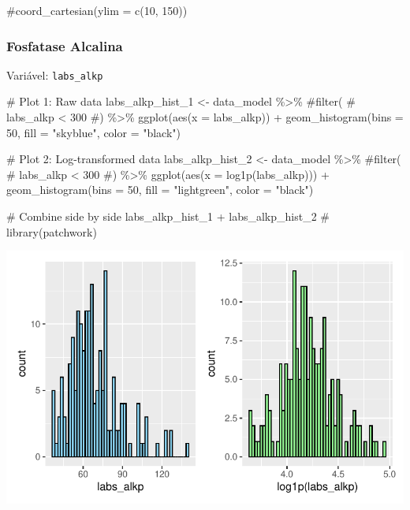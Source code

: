 \documentclass[
  12pt,
]{article}
\newenvironment{Shaded}{\begin{snugshade}}{\end{snugshade}}
\newcommand{\AttributeTok}[1]{\textcolor[rgb]{0.40,0.45,0.13}{#1}}
\newcommand{\CommentTok}[1]{\textcolor[rgb]{0.37,0.37,0.37}{#1}}
\newcommand{\DecValTok}[1]{\textcolor[rgb]{0.68,0.00,0.00}{#1}}
\newcommand{\FunctionTok}[1]{\textcolor[rgb]{0.28,0.35,0.67}{#1}}
\newcommand{\NormalTok}[1]{\textcolor[rgb]{0.00,0.23,0.31}{#1}}
\newcommand{\OtherTok}[1]{\textcolor[rgb]{0.00,0.23,0.31}{#1}}
\newcommand{\SpecialCharTok}[1]{\textcolor[rgb]{0.37,0.37,0.37}{#1}}
\newcommand{\StringTok}[1]{\textcolor[rgb]{0.13,0.47,0.30}{#1}}
\begin{document}
\begin{Shaded}
\begin{Highlighting}[]
    \CommentTok{\#coord\_cartesian(ylim = c(10, 150))}
\end{Highlighting}
\end{Shaded}

\subsubsection{Fosfatase Alcalina}\label{fosfatase-alcalina}

Variável: \texttt{labs\_alkp}

\begin{Shaded}
\begin{Highlighting}[]
\CommentTok{\# Plot 1: Raw data}
\NormalTok{labs\_alkp\_hist\_1 }\OtherTok{\textless{}{-}}\NormalTok{ data\_model }\SpecialCharTok{\%\textgreater{}\%} 
    \CommentTok{\#filter(}
    \CommentTok{\#    labs\_alkp \textless{} 300}
    \CommentTok{\#) \%\textgreater{}\% }
    \FunctionTok{ggplot}\NormalTok{(}\FunctionTok{aes}\NormalTok{(}\AttributeTok{x =}\NormalTok{ labs\_alkp)) }\SpecialCharTok{+} 
    \FunctionTok{geom\_histogram}\NormalTok{(}\AttributeTok{bins =} \DecValTok{50}\NormalTok{, }\AttributeTok{fill =} \StringTok{"skyblue"}\NormalTok{, }\AttributeTok{color =} \StringTok{"black"}\NormalTok{)}

\CommentTok{\# Plot 2: Log{-}transformed data}
\NormalTok{labs\_alkp\_hist\_2 }\OtherTok{\textless{}{-}}\NormalTok{ data\_model }\SpecialCharTok{\%\textgreater{}\%} 
    \CommentTok{\#filter(}
    \CommentTok{\#    labs\_alkp \textless{} 300}
    \CommentTok{\#) \%\textgreater{}\%}
    \FunctionTok{ggplot}\NormalTok{(}\FunctionTok{aes}\NormalTok{(}\AttributeTok{x =} \FunctionTok{log1p}\NormalTok{(labs\_alkp))) }\SpecialCharTok{+} 
    \FunctionTok{geom\_histogram}\NormalTok{(}\AttributeTok{bins =} \DecValTok{50}\NormalTok{, }\AttributeTok{fill =} \StringTok{"lightgreen"}\NormalTok{, }\AttributeTok{color =} \StringTok{"black"}\NormalTok{)}

\CommentTok{\# Combine side by side}
\NormalTok{labs\_alkp\_hist\_1 }\SpecialCharTok{+}\NormalTok{ labs\_alkp\_hist\_2 }\CommentTok{\# library(patchwork)}
\end{Highlighting}
\end{Shaded}

\includegraphics{Outcomes_files/figure-pdf/labs_alkp_1-1.pdf}
\end{document}
